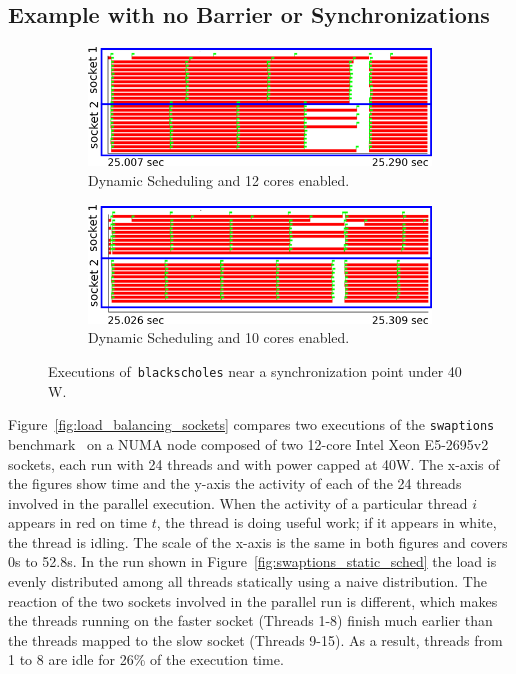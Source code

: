 \subsection{Example with no Barrier or Synchronizations}
\label{sec:nobarriers}

\begin{figure}[ht]
  \begin{subfigure}{\columnwidth}
        \includegraphics[width=\columnwidth]{power_aware_runtime/figures/blackscholes-80watts-even}
        \caption{Dynamic Scheduling and 12 cores enabled.}
        \label{fig:blackscholes_even_conf_trace}
  \end{subfigure}
  \begin{subfigure}{\columnwidth}
        \includegraphics[width=\columnwidth]{power_aware_runtime/figures/blackscholes-80watts-best}
        \caption{Dynamic Scheduling and 10 cores enabled.}
        \label{fig:blackscholes_best_conf_trace}
  \end{subfigure}
  \caption{Executions of~\texttt{blackscholes} near a synchronization point under 40 W.}
  \label{fig:overprovisioning_sockets}%
\vspace{.5cm}
\end{figure}


Figure~\ref{fig:load_balancing_sockets} compares two executions of the \texttt{swaptions}
benchmark~\cite{Chasapis:2015:PEI:2836331.2829952} on a NUMA node composed of two 12-core Intel Xeon E5-2695v2
sockets, each run with 24 threads and with power capped at 40W.  The x-axis of the figures
show time and the y-axis the activity of each of the 24 threads involved in the parallel
execution.  When the activity of a particular thread $i$ appears in red on time $t$, the
thread is doing useful work; if it appears in white, the thread is idling.  The scale of
the x-axis is the same in both figures and covers 0s to 52.8s.  In the run shown in
Figure~\ref{fig:swaptions_static_sched} the load is evenly distributed among all threads
statically using a naive distribution.  The reaction of the two sockets involved in the
parallel run is different, which makes the threads running on the faster socket (Threads
1-8) finish much earlier than the threads mapped to the slow socket (Threads 9-15). As a
result, threads from 1 to 8 are idle for 26\% of the execution time.

